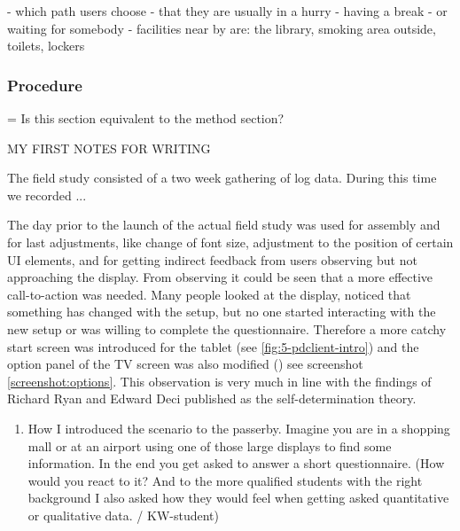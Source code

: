 	- which path users choose
	- that they are usually in a hurry
	- having a break
	- or waiting for somebody
	- facilities near by are: the library, smoking area outside, toilets, lockers





	\subsubsection{Procedure}
		= Is this section equivalent to the method section?

		MY FIRST NOTES FOR WRITING

		The field study consisted of a two week gathering of log data. During this time we recorded ...


		The day prior to the launch of the actual field study was used for assembly and for last adjustments, like change of font size, adjustment to the position of certain UI elements, and for getting indirect feedback from users observing but not approaching the display.
		From observing it could be seen that a more effective call-to-action was needed. Many people looked at the display, noticed that something has changed with the setup, but no one started interacting with the new setup or was willing to complete the questionnaire. Therefore a more catchy start screen was introduced for the tablet (see \ref{fig:5-pdclient-intro}) and the option panel of the TV screen was also modified () see screenshot \ref{screenshot:options}. 
		This observation is very much in line with the findings of Richard Ryan and Edward Deci published as the self-determination theory\cite{ryan2000self}.




		\begin{enumerate}
		\item How I introduced the scenario to the passerby. Imagine you are in a shopping mall or at an airport using one of those large displays to find some information. In the end you get asked to answer a short questionnaire. (How would you react to it? And to the more qualified students with the right background I also asked how they would feel when getting asked quantitative or qualitative data. / KW-student) 
		\end{enumerate}

